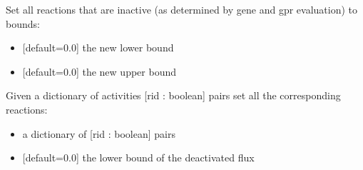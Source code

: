 \documentclass[letterpaper,10pt,english]{sphinxmanual}
\begin{document}
\begin{fulllineitems}
\begin{fulllineitems}
\begin{itemize}
\end{itemize}

\end{fulllineitems}


\begin{fulllineitems}
\label{\detokenize{modules_doc:cbmpy.CBModel.Model.setAllInactiveGPRBounds}}
\pysigstartsignatures
{}
\pysigstopsignatures
\sphinxAtStartPar
Set all reactions that are inactive (as determined by gene and gpr evaluation) to bounds:
\begin{itemize}
\item {} 
\sphinxAtStartPar
{} {[}default=0.0{]} the new lower bound

\item {} 
\sphinxAtStartPar
{} {[}default=0.0{]} the new upper bound

\end{itemize}

\end{fulllineitems}


\begin{fulllineitems}
\label{\detokenize{modules_doc:cbmpy.CBModel.Model.setAllProteinActivities}}
\pysigstartsignatures
{}
\pysigstopsignatures
\sphinxAtStartPar
Given a dictionary of activities {[}rid : boolean{]} pairs set all the corresponding reactions:
\begin{itemize}
\item {} 
\sphinxAtStartPar
{} a dictionary of {[}rid : boolean{]} pairs

\item {} 
\sphinxAtStartPar
{} {[}default=0.0{]} the lower bound of the deactivated flux


\end{itemize}
\end{fulllineitems}
\end{fulllineitems}
\end{document}
